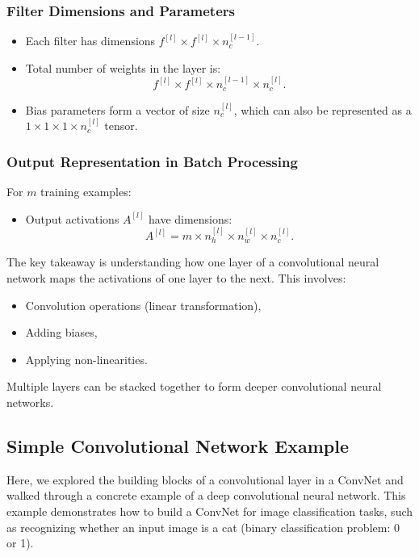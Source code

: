 \documentclass[letterpaper,12pt,notitlepage,twoside]{report}
\begin{document}
\subsubsection*{Filter Dimensions and Parameters}
\begin{itemize}[nosep]
    \item Each filter has dimensions \( f^{[l]} \times f^{[l]} \times n_c^{[l-1]} \).
    \item Total number of weights in the layer is:
    \[
    f^{[l]} \times f^{[l]} \times n_c^{[l-1]} \times n_c^{[l]}.
    \]
    \item Bias parameters form a vector of size \( n_c^{[l]} \), which can also be represented as a \( 1 \times 1 \times 1 \times n_c^{[l]} \) tensor.
\end{itemize}

\subsubsection*{Output Representation in Batch Processing}
For \( m \) training examples:
\begin{itemize}
    \item Output activations \( A^{[l]} \) have dimensions:
    \[
    A^{[l]} = m \times n_h^{[l]} \times n_w^{[l]} \times n_c^{[l]}.
    \]
\end{itemize}

The key takeaway is understanding how one layer of a convolutional neural network maps the activations of one layer to the next. This involves:
\begin{itemize}[nosep]
    \item Convolution operations (linear transformation),
    \item Adding biases,
    \item Applying non-linearities.
\end{itemize}
Multiple layers can be stacked together to form deeper convolutional neural networks.

\subsection{Simple Convolutional Network Example}
Here, we explored the building blocks of a convolutional layer in a ConvNet and walked through a concrete example of a deep convolutional neural network. This example demonstrates how to build a ConvNet for image classification tasks, such as recognizing whether an input image is a cat (binary classification problem: 0 or 1).
\end{document}

